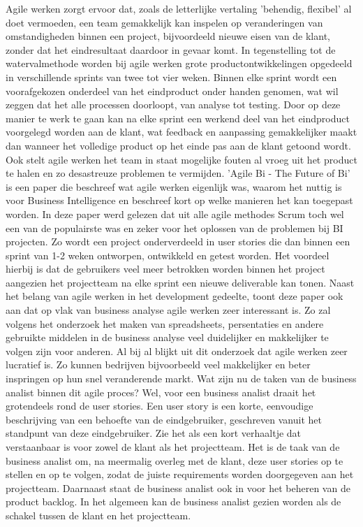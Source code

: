 \documentclass{hogent-article}
\begin{document}
Agile werken zorgt ervoor dat, zoals de letterlijke vertaling 'behendig, flexibel' al doet vermoeden, een team gemakkelijk kan inspelen op veranderingen van omstandigheden binnen een project, bijvoordeeld nieuwe eisen van de klant, zonder dat het eindresultaat daardoor in gevaar komt. In tegenstelling tot de watervalmethode worden bij agile werken grote productontwikkelingen opgedeeld in verschillende sprints van twee tot vier weken. Binnen elke sprint wordt een voorafgekozen onderdeel van het eindproduct onder handen genomen, wat wil zeggen dat het alle processen doorloopt, van analyse tot testing. Door op deze manier te werk te gaan kan na elke sprint een werkend deel van het eindproduct voorgelegd worden aan de klant, wat feedback en aanpassing gemakkelijker maakt dan wanneer het volledige product op het einde pas aan de klant getoond wordt. Ook stelt agile werken het team in staat mogelijke fouten al vroeg uit het product te halen en zo desastreuze problemen te vermijden.\newline
\newline 
'Agile Bi - The Future of Bi'\autocite{Muntean2013} is een paper die beschreef wat agile werken eigenlijk was, waarom het nuttig is voor Business Intelligence en beschreef kort op welke manieren het kan toegepast worden. In deze paper werd gelezen dat uit alle agile methodes Scrum toch wel een van de populairste was en zeker voor het oplossen van de problemen bij BI projecten. Zo wordt een project onderverdeeld in user stories die dan binnen een sprint van 1-2 weken ontworpen, ontwikkeld en getest worden. Het voordeel hierbij is dat de gebruikers veel meer betrokken worden binnen het project aangezien het projectteam na elke sprint een nieuwe deliverable kan tonen. Naast het belang van agile werken in het development gedeelte, toont deze paper ook aan dat op vlak van business analyse agile werken zeer interessant is. Zo zal volgens het onderzoek het maken van spreadsheets, persentaties en andere gebruikte middelen in de business analyse veel duidelijker en makkelijker te volgen zijn voor anderen. Al bij al blijkt uit dit onderzoek dat agile werken zeer lucratief is. Zo kunnen bedrijven bijvoorbeeld veel makkelijker en beter inspringen op hun snel veranderende markt. \newline
\newline Wat zijn nu de taken van de business analist binnen dit agile proces? Wel, voor een business analist draait het grotendeels rond de user stories. Een user story is een korte, eenvoudige beschrijving van een behoefte van de eindgebruiker, geschreven vanuit het standpunt van deze eindgebruiker. Zie het als een kort verhaaltje dat verstaanbaar is voor zowel de klant als het projectteam. Het is de taak van de business analist om, na meermalig overleg met de klant, deze user stories op te stellen en op te volgen, zodat de juiste requirements worden doorgegeven aan het projectteam. Daarnaast staat de business analist ook in voor het beheren van de product backlog. In het algemeen kan de business analist gezien worden als de schakel tussen de klant en het projectteam.
\end{document}
